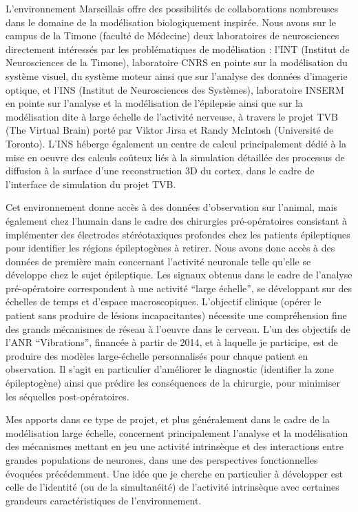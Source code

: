 \documentclass[11pt]{article}
\begin{document}
L'environnement Marseillais offre des possibilités de collaborations nombreuses dans le domaine
de la modélisation biologiquement inspirée. Nous avons sur le campus de la Timone (faculté de Médecine)
deux laboratoires de neurosciences directement intéressés par les problématiques de modélisation : l'INT
(Institut de Neurosciences de la Timone), laboratoire CNRS en pointe sur la modélisation du système visuel,
du système moteur ainsi que sur l'analyse des données d'imagerie optique, et l'INS (Institut de Neurosciences
des Systèmes), laboratoire INSERM en pointe sur l'analyse et la modélisation de l'épilepsie ainsi que sur la 
modélisation dite à large échelle de l'activité nerveuse, à travers le projet TVB (The Virtual Brain) porté
par Viktor Jirsa et Randy McIntosh (Université de Toronto). 
L'INS héberge également un centre de calcul principalement dédié à 
la mise en oeuvre des calculs coûteux liés à la simulation détaillée des processus de 
diffusion à la surface d'une reconstruction 3D du cortex, dans le cadre de 
l'interface de simulation du projet TVB.

Cet environnement donne accès à des données d'observation sur l'animal, mais également chez l'humain dans le cadre
des chirurgies pré-opératoires consistant à implémenter des électrodes stéréotaxiques profondes chez les
patients épileptiques pour identifier les régions épileptogènes à retirer.
Nous avons donc accès à des données de première main concernant l'activité neuronale telle qu'elle se développe
chez le sujet épileptique.
Les signaux obtenus dans le cadre de l'analyse pré-opératoire correspondent à une activité ``large échelle'',
se développant sur des échelles de temps et d'espace macroscopiques.
L'objectif clinique (opérer le patient sans produire de lésions incapacitantes) nécessite une compréhension
fine des grands mécanismes de réseau à l'oeuvre dans le cerveau.
L'un des objectifs de l'ANR ``Vibrations'', financée à partir de 2014, et à laquelle je participe, est de 
produire des modèles large-échelle personnalisés pour chaque patient en observation. Il s'agit 
en particulier d'améliorer le diagnostic (identifier la zone épileptogène) 
ainsi que prédire les conséquences de la chirurgie, pour minimiser les
séquelles post-opératoires.

Mes apports dans ce type de projet, et plus généralement dans le cadre de la
modélisation large échelle, concernent principalement l'analyse et la modélisation
des mécanismes mettant en jeu une activité intrinsèque et des interactions entre grandes
populations de neurones, dans une des perspectives fonctionnelles évoquées 
précédemment. Une idée que je cherche en particulier à développer est celle de 
l'identité (ou de la simultanéité) de l'activité intrinsèque avec certaines 
grandeurs caractéristiques de l'environnement.
\end{document}
